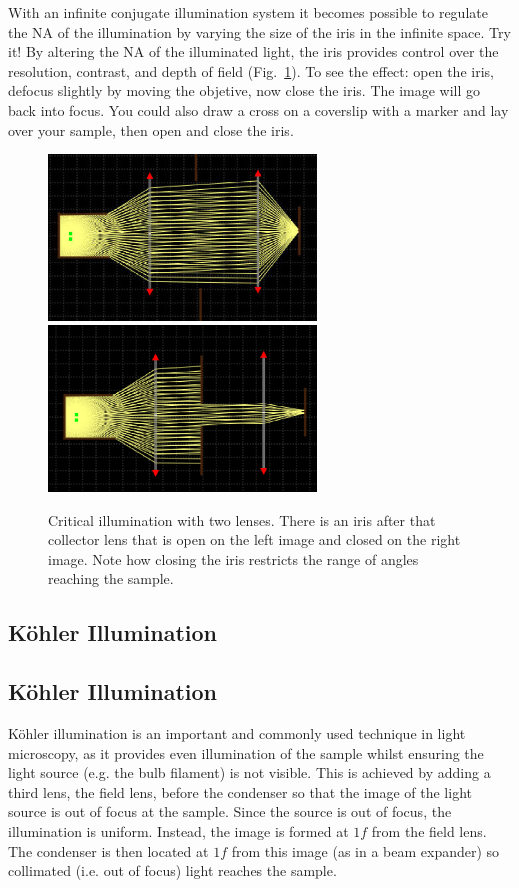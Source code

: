 \documentclass[a4paper]{report}
\begin{document}
With an infinite conjugate illumination system it becomes possible to regulate the NA of the illumination by varying the size of the iris in the infinite space. 
Try it!
By altering the NA of the illuminated light, the iris provides control over the resolution, contrast, and depth of field (Fig.~\ref{fig:critical_iris}).
To see the effect: open the iris, defocus slightly by moving the objetive, now close the iris. The image will go back into focus. 
You could also draw a cross on a coverslip with a marker and lay over your sample, then open and close the iris.

\begin{figure}[h]
\center
\includegraphics[width=2.8in]{critical_open_iris.eps}
\includegraphics[width=2.8in]{critical_closed_iris.eps}
\caption{Critical illumination with two lenses. 
There is an iris after that collector lens that is open on the left image and closed on the right image. 
Note how closing the iris restricts the range of angles reaching the sample.}
\label{fig:critical_iris}
\end{figure}



\clearpage

\subsection{K\"{o}hler Illumination}

\subsection{K\"{o}hler Illumination}
K\"{o}hler illumination is an important and commonly used technique in light microscopy, as it provides even illumination of the sample whilst ensuring the light source (e.g. the bulb filament) is not visible. 
This is achieved by adding a third lens, the field lens, before the condenser so that the image of the light source is out of focus at the sample. 
Since the source is out of focus, the illumination is uniform. 
Instead, the image is formed at $1f$ from the field lens. 
The condenser is then located at $1f$ from this image (as in a beam expander) so collimated (i.e. out of focus) light reaches the sample. 
\end{document}
